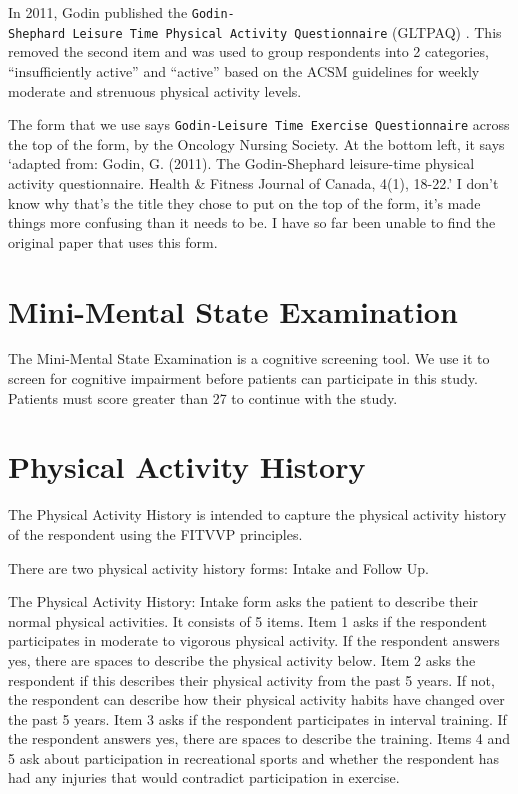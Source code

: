 \documentclass[
]{book}
\begin{document}
In 2011, Godin published the \texttt{Godin-Shephard\ Leisure\ Time\ Physical\ Activity\ Questionnaire} (GLTPAQ) \citep{godinshepherd11}. This removed the second item and was used to group respondents into 2 categories, ``insufficiently active'' and ``active'' based on the ACSM guidelines for weekly moderate and strenuous physical activity levels.

The form that we use says \texttt{Godin-Leisure\ Time\ Exercise\ Questionnaire} across the top of the form, by the Oncology Nursing Society. At the bottom left, it says `adapted from: Godin, G. (2011). The Godin-Shephard leisure-time physical activity questionnaire. Health \& Fitness Journal of Canada, 4(1), 18-22.' I don't know why that's the title they chose to put on the top of the form, it's made things more confusing than it needs to be. I have so far been unable to find the original paper that uses this form.

\hypertarget{Appendix-Surveys-mmse}{%
\section{Mini-Mental State Examination}\label{Appendix-Surveys-mmse}}

The Mini-Mental State Examination is a cognitive screening tool. We use it to screen for cognitive impairment before patients can participate in this study. Patients must score greater than 27 to continue with the study.

\hypertarget{Appendix-Surveys-pah}{%
\section{Physical Activity History}\label{Appendix-Surveys-pah}}

The Physical Activity History is intended to capture the physical activity history of the respondent using the FITVVP principles.

There are two physical activity history forms: Intake and Follow Up.

The Physical Activity History: Intake form asks the patient to describe their normal physical activities. It consists of 5 items. Item 1 asks if the respondent participates in moderate to vigorous physical activity. If the respondent answers yes, there are spaces to describe the physical activity below. Item 2 asks the respondent if this describes their physical activity from the past 5 years. If not, the respondent can describe how their physical activity habits have changed over the past 5 years. Item 3 asks if the respondent participates in interval training. If the respondent answers yes, there are spaces to describe the training. Items 4 and 5 ask about participation in recreational sports and whether the respondent has had any injuries that would contradict participation in exercise.
\end{document}
